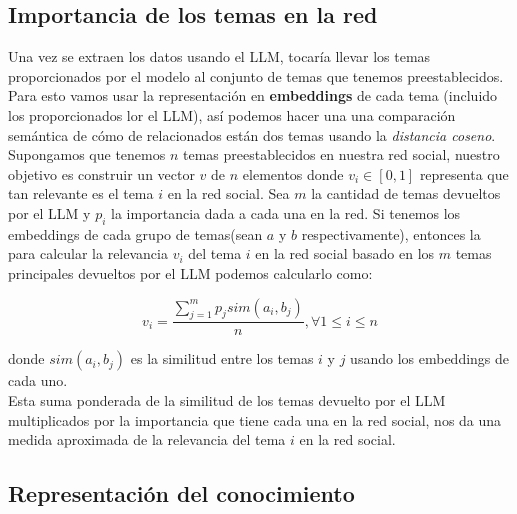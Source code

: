 \documentclass[12pt]{article}
\begin{document}
\subsection{Importancia de los temas en la red}

Una vez se extraen los datos usando el LLM, tocaría llevar los temas proporcionados por el modelo al conjunto de temas que tenemos preestablecidos. Para esto vamos usar la representación en \textbf{embeddings} de cada tema (incluido los proporcionados lor el LLM),
así podemos hacer una una comparación semántica de cómo de relacionados están dos temas usando la \textit{distancia coseno}.
\\
Supongamos que tenemos $n$ temas preestablecidos en nuestra red social, nuestro objetivo es construir un vector $v$ de $n$ elementos donde $v_i \in [0,1]$ representa que tan relevante es el tema $i$ en la red social. Sea $m$ la cantidad de temas devueltos por el LLM y $p_i$ la importancia dada a cada una en la red.
Si tenemos los embeddings de cada grupo de temas(sean $a$ y $b$ respectivamente), entonces la para calcular la relevancia $v_i$ del tema $i$ en la red social basado en los $m$ temas principales devueltos por el LLM podemos calcularlo como:

$$
v_i = \frac{\sum_{j=1}^{m} p_j sim(a_i, b_j)}{n},  \forall 1 \leq i \leq n   
$$

donde $sim(a_i, b_j)$ es la similitud entre los temas $i$ y $j$ usando los embeddings de cada uno.
\\
Esta suma ponderada de la similitud de los temas devuelto por el LLM multiplicados por la importancia que tiene cada una en la red social, nos da una medida aproximada de la relevancia del tema $i$ en la red social.

\subsection{Representación del conocimiento}
\end{document}

